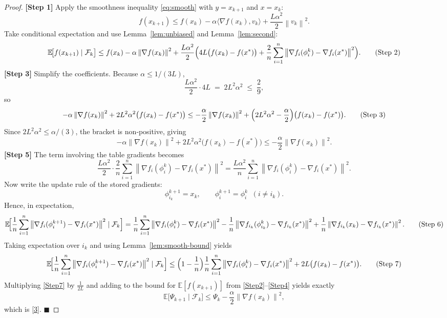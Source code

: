 \documentclass{article}
\newcommand{\E}{\mathbb{E}}
\newcommand{\norm}[1]{\left\|#1\right\|}
\newcommand{\inner}[2]{\langle #1,#2\rangle}
\newcommand{\grad}{\nabla}
\begin{document}
\begin{proof}
\textbf{[Step 1]} Apply the smoothness inequality \eqref{eq:smooth} with $y=x_{k+1}$
and $x=x_k$:
\[
f(x_{k+1})\le f(x_k)-\alpha\inner{\grad f(x_k)}{v_k}
+\frac{L\alpha^{2}}{2}\norm{v_k}^{2}.
\tag{Step 1}
\]
Take conditional expectation and use Lemma~\ref{lem:unbiased} and Lemma~\ref{lem:second}:
\[
\E\!\bigl[f(x_{k+1})\mid\mathcal{F}_k\bigr]
\le f(x_k)-\alpha\norm{\grad f(x_k)}^{2}
+\frac{L\alpha^{2}}{2}\Bigl(
4L\bigl(f(x_k)-f(x^{*})\bigr)
+\frac{2}{n}\sum_{i=1}^{n}\norm{\grad f_i(\phi_i^{k})-\grad f_i(x^{*})}^{2}
\Bigr).
\tag{Step 2}
\]
\textbf{[Step 3]} Simplify the coefficients. Because $\alpha\le 1/(3L)$,
\[
\frac{L\alpha^{2}}{2}\cdot4L\;=\;2L^{2}\alpha^{2}\;\le\;\frac{2}{9},
\]
so
\[
-\alpha\norm{\grad f(x_k)}^{2}+2L^{2}\alpha^{2}\bigl(f(x_k)-f(x^{*})\bigr)
\le -\frac{\alpha}{2}\norm{\grad f(x_k)}^{2}
+\Bigl(2L^{2}\alpha^{2}-\frac{\alpha}{2}\Bigr)\bigl(f(x_k)-f(x^{*})\bigr).
\tag{Step 3}
\]
Since $2L^{2}\alpha^{2}\le\alpha/(3)$, the bracket is non‑positive, giving
\[
-\alpha\norm{\grad f(x_k)}^{2}+2L^{2}\alpha^{2}\bigl(f(x_k)-f(x^{*})\bigr)
\le -\frac{\alpha}{2}\norm{\grad f(x_k)}^{2}.
\tag{Step 4}
\]
\textbf{[Step 5]} The term involving the table gradients becomes
\[
\frac{L\alpha^{2}}{2}\cdot\frac{2}{n}\sum_{i=1}^{n}
\norm{\grad f_i(\phi_i^{k})-\grad f_i(x^{*})}^{2}
= \frac{L\alpha^{2}}{n}\sum_{i=1}^{n}
\norm{\grad f_i(\phi_i^{k})-\grad f_i(x^{*})}^{2}.
\tag{Step 5}
\]
Now write the update rule of the stored gradients:
\[
\phi_{i_k}^{k+1}=x_k,\qquad
\phi_i^{k+1}=\phi_i^{k}\;\;(i\neq i_k).
\]
Hence, in expectation,
\[
\E\!\Bigl[\frac{1}{n}\sum_{i=1}^{n}
\norm{\grad f_i(\phi_i^{k+1})-\grad f_i(x^{*})}^{2}\mid\mathcal{F}_k\Bigr]
=
\frac{1}{n}\sum_{i=1}^{n}
\norm{\grad f_i(\phi_i^{k})-\grad f_i(x^{*})}^{2}
-\frac{1}{n}\norm{\grad f_{i_k}(\phi_{i_k}^{k})-\grad f_{i_k}(x^{*})}^{2}
+\frac{1}{n}\norm{\grad f_{i_k}(x_k)-\grad f_{i_k}(x^{*})}^{2}.
\tag{Step 6}
\]
Taking expectation over $i_k$ and using Lemma~\ref{lem:smooth-bound} yields
\[
\E\!\Bigl[\frac{1}{n}\sum_{i=1}^{n}
\norm{\grad f_i(\phi_i^{k+1})-\grad f_i(x^{*})}^{2}\mid\mathcal{F}_k\Bigr]
\le
\Bigl(1-\frac{1}{n}\Bigr)\frac{1}{n}\sum_{i=1}^{n}
\norm{\grad f_i(\phi_i^{k})-\grad f_i(x^{*})}^{2}
+2L\bigl(f(x_k)-f(x^{*})\bigr).
\tag{Step 7}
\]
Multiplying \eqref{Step7} by $\frac{1}{2L}$ and adding to the bound for
$\E[f(x_{k+1})]$ from \eqref{Step2}–\eqref{Step4} yields exactly
\[
\E\!\bigl[\Psi_{k+1}\mid\mathcal{F}_k\bigr]
\le \Psi_k-\frac{\alpha}{2}\norm{\grad f(x_k)}^{2},
\]
which is \eqref{3}. $\blacksquare$
\end{proof}
\end{document}
